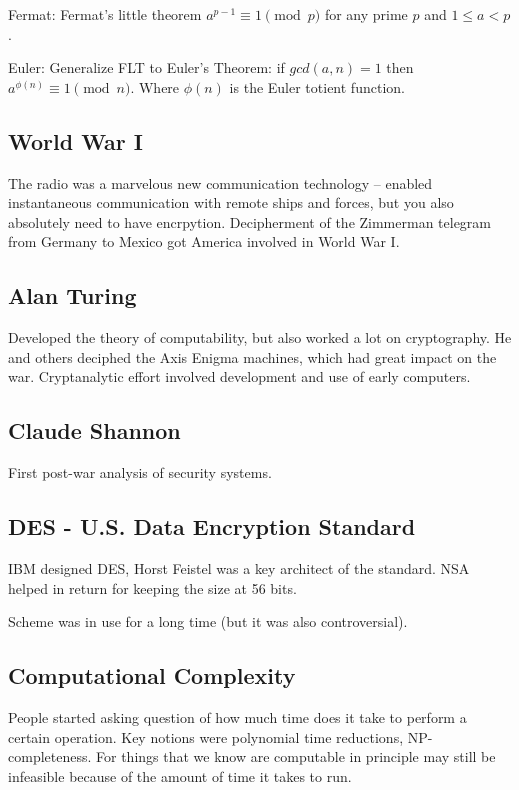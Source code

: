 \documentclass[psamsfonts]{amsart}
\begin{document}
Fermat: Fermat's little theorem $a^{p-1} \equiv 1 \pmod p$ for any prime $p$ and $1 \leq a < p$. 

Euler: Generalize FLT to Euler's Theorem: if $gcd(a,n) = 1$ then $a^{\phi(n)} \equiv 1 \pmod n$. Where $\phi(n)$ is the Euler totient function.


\subsection{World War I}

The radio was a marvelous new communication technology -- enabled instantaneous communication with remote ships and forces, but you also absolutely need to have encrpytion. Decipherment of the Zimmerman telegram from Germany to Mexico got America involved in World War I.

\subsection{Alan Turing}

Developed the theory of computability, but also worked a lot on cryptography. He and others deciphed the Axis Enigma machines, which had great impact on the war. Cryptanalytic effort involved development and use of early computers.

\subsection{Claude Shannon}

First post-war analysis of security systems. 

\subsection{DES - U.S. Data Encryption Standard}

IBM designed DES, Horst Feistel was a key architect of the standard. NSA helped in return for keeping the size at 56 bits. 

Scheme was in use for a long time (but it was also controversial). 

\subsection{Computational Complexity}

People started asking question of how much time does it take to perform a certain operation. Key notions were polynomial time reductions, NP-completeness. For things that we know are computable in principle may still be infeasible because of the amount of time it takes to run.
\end{document}
